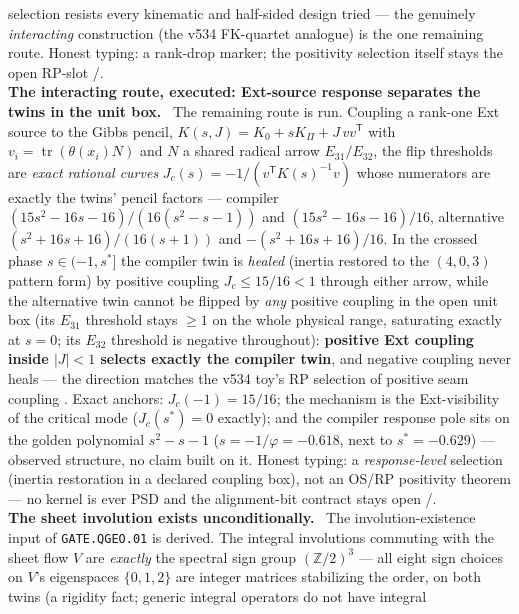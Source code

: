 \begin{winbox}
selection resists every kinematic and half-sided design tried --- the genuinely
\emph{interacting} construction (the v534 FK-quartet analogue) is the one remaining route.
Honest typing: a rank-drop marker; the positivity selection itself stays the open RP-slot
\mE/\mO.
\smallskip\\
\noindent\textbf{The interacting route, executed: Ext-source response separates the twins in
the unit box.} \ The remaining route is run.  Coupling a
rank-one Ext source to the Gibbs pencil, $K(s,J)=K_0+sK_\Pi+J\,vv^{\mathsf T}$ with
$v_i=\operatorname{tr}(\theta(x_i)N)$ and $N$ a shared radical arrow $E_{31}/E_{32}$, the flip
thresholds are \emph{exact rational curves} $J_c(s)=-1/(v^{\mathsf T}K(s)^{-1}v)$ whose
numerators are exactly the twins' pencil factors --- compiler
$(15s^2{-}16s{-}16)/(16(s^2{-}s{-}1))$ and $(15s^2{-}16s{-}16)/16$, alternative
$(s^2{+}16s{+}16)/(16(s{+}1))$ and $-(s^2{+}16s{+}16)/16$.  In the crossed phase
$s\in(-1,s^*]$ the compiler twin is \emph{healed} (inertia restored to the $(4,0,3)$ pattern
form) by positive coupling $J_c\le 15/16<1$ through either arrow, while the alternative twin
cannot be flipped by \emph{any} positive coupling in the open unit box (its $E_{31}$ threshold
stays $\ge1$ on the whole physical range, saturating exactly at $s=0$; its $E_{32}$ threshold
is negative throughout): \textbf{positive Ext coupling inside $|J|<1$ selects exactly the
compiler twin}, and negative coupling never heals --- the direction matches the v534 toy's RP
selection of positive seam coupling \mE.  Exact anchors: $J_c(-1)=15/16$; the mechanism is the
Ext-visibility of the critical mode ($J_c(s^*)=0$ exactly); and the compiler response pole
sits on the golden polynomial $s^2-s-1$ ($s=-1/\varphi=-0.618$, next to $s^*=-0.629$) ---
observed structure, no claim built on it.  Honest typing: a \emph{response-level} selection
(inertia restoration in a declared coupling box), not an OS/RP positivity theorem --- no
kernel is ever PSD and the alignment-bit contract stays open \mE/\mC.
\smallskip\\
\noindent\textbf{The sheet involution exists unconditionally.}
\ The involution-existence input of
\texttt{GATE.QGEO.01} is derived.  The integral involutions commuting
with the sheet flow $V$ are \emph{exactly} the spectral sign group
$(\mathbb{Z}/2)^3$ --- all eight sign choices on $V$'s eigenspaces
$\{0,1,2\}$ are integer matrices stabilizing the order, on both twins
(a rigidity fact; generic integral operators do not have integral

\end{winbox}
